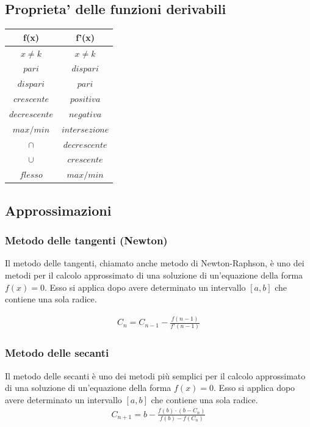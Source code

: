 \documentclass[a4paper]{article}
\begin{document}
	\subsection{Proprieta' delle funzioni derivabili}
	\begin{center}
		\begin{tabular}{|c|c|}
		\hline 
		\textbf{f(x)} & \textbf{f'(x)} \\ 
		\hline 
		$x \ne k$ & $x \ne k$ \\ 
		\hline 
		$pari$ & $dispari$ \\ 
		\hline 
		$dispari$ & $pari$ \\ 
		\hline 
		$crescente$ & $positiva$ \\ 
		\hline 
		$decrescente$ & $negativa$ \\ 
		\hline 
		$max/min$ & $intersezione$ \\ 
		\hline
		$\cap$	&	$decrescente$ \\
		\hline
		$\cup$	&	$crescente$	\\
		\hline
		$flesso$ & $max/min$	\\
		\hline
		\end{tabular} 
	\end{center}
	
	\subsection{Approssimazioni}
	\subsubsection{Metodo delle tangenti (Newton)}
	Il metodo delle tangenti, chiamato anche metodo di Newton-Raphson, è uno dei metodi per il calcolo approssimato di una soluzione di un'equazione della forma $f(x)=0$. Esso si applica dopo avere determinato un intervallo $[a,b]$ che contiene una sola radice.
	
	\begin{align*}
		C_n = C_{n-1}-\frac{f(n-1)}{f'(n-1)}
	\end{align*}
	\subsubsection{Metodo delle secanti}
	Il metodo delle secanti è uno dei metodi più semplici per il calcolo approssimato di una soluzione di un'equazione della forma $f(x)=0$. Esso si applica dopo avere determinato un intervallo $[a,b]$ che contiene una sola radice.
	\begin{align*}
		C_{n+1} = b-\frac{f(b)\cdot (b-C_n)}{f(b)-f(C_n)}
	\end{align*}
	
\end{document}
